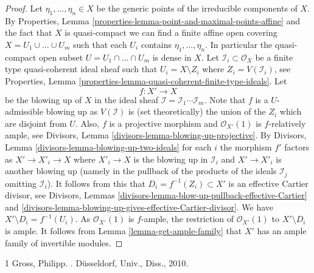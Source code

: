 \documentclass[10pt,a4paper]{amsart}
\theoremstyle{plain}
\theoremstyle{definition}
\theoremstyle{remark}
\numberwithin{equation}{subsection}
\begin{document}
\begin{proof}
Let $\eta_1, \ldots, \eta_n \in X$ be the generic points of the
irreducible components of $X$. By
Properties, Lemma \ref{properties-lemma-point-and-maximal-points-affine}
and the fact that $X$ is quasi-compact we can find a finite affine
open covering $X = U_1 \cup \ldots \cup U_m$ such that
each $U_i$ contains $\eta_1, \ldots, \eta_n$. In particular
the quasi-compact open subset $U = U_1 \cap \ldots \cap U_m$ is dense in $X$.
Let $\mathcal{I}_i \subset \mathcal{O}_X$ be a finite type quasi-coherent
ideal sheaf such that $U_i = X \setminus Z_i$ where $Z_i = V(\mathcal{I}_i)$,
see Properties, Lemma \ref{properties-lemma-quasi-coherent-finite-type-ideals}.
Let
$$
f : X' \longrightarrow X
$$
be the blowing up of $X$ in the ideal sheaf
$\mathcal{I} = \mathcal{I}_1 \cdots \mathcal{I}_m$.
Note that $f$ is a $U$-admissible blowing up as $V(\mathcal{I})$
is (set theoretically) the union of the $Z_i$ which are disjoint from $U$.
Also, $f$ is a projective morphism and
$\mathcal{O}_{X'}(1)$ is $f$-relatively ample, see
Divisors, Lemma \ref{divisors-lemma-blowing-up-projective}.
By Divisors, Lemma \ref{divisors-lemma-blowing-up-two-ideals}
for each $i$ the morphism $f'$ factors as $X' \to X'_i \to X$
where $X'_i \to X$ is the blowing up in $\mathcal{I}_i$
and $X' \to X'_i$ is another blowing up (namely in the pullback
of the products of the ideals $\mathcal{I}_j$ omitting $\mathcal{I}_i$).
It follows from this that $D_i = f^{-1}(Z_i) \subset X'$ is an effective
Cartier divisor, see
Divisors, Lemmas \ref{divisors-lemma-blow-up-pullback-effective-Cartier} and
\ref{divisors-lemma-blowing-up-gives-effective-Cartier-divisor}.
We have $X' \setminus D_i = f^{-1}(U_i)$. As $\mathcal{O}_{X'}(1)$ is
$f$-ample, the restriction of
$\mathcal{O}_{X'}(1)$ to $X' \setminus D_i$ is ample. It follows from
Lemma \ref{lemma-get-ample-family}
that $X'$ has an ample family of invertible modules.
\end{proof}

\begin{thebibliography}{1}
Gross, Philipp.
.
\newblock D{\"u}sseldorf, Univ., Diss., 2010.
\end{thebibliography}
\end{document}
